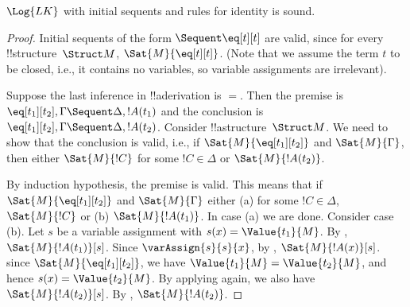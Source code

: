 \documentclass[../../../include/open-logic-section]{subfiles}
\begin{document}

\begin{prop}
$\Log{LK}$ with initial sequents and rules for identity is sound.
\end{prop}

\begin{proof}
Initial sequents of the form ${} \Sequent \eq[t][t]$ are valid, since
for every !!{structure}~$\Struct M$, $\Sat{M}{\eq[t][t]}$. (Note that
we assume the term $t$ to be closed, i.e., it contains no variables,
so variable assignments are irrelevant).

Suppose the last inference in !!a{derivation} is $=$. Then the premise
is $\eq[t_1][t_2], \Gamma \Sequent \Delta, !A(t_1)$ and the conclusion
is $\eq[t_1][t_2], \Gamma \Sequent \Delta, !A(t_2)$. Consider
!!a{structure}~$\Struct M$. We need to show that the conclusion is
valid, i.e., if $\Sat{M}{\eq[t_1][t_2]}$ and $\Sat{M}{\Gamma}$, then
either $\Sat{M}{!C}$ for some $!C \in \Delta$ or $\Sat{M}{!A(t_2)}$.

By induction hypothesis, the premise is valid. This means that if
$\Sat{M}{\eq[t_1][t_2]}$ and $\Sat{M}{\Gamma}$ either (a) for some $!C
\in \Delta$, $\Sat{M}{!C}$ or (b) $\Sat{M}{!A(t_1)}$. In case (a) we
are done. Consider case (b).  Let $s$ be a variable assignment with
$s(x) = \Value{t_1}{M}$.  By ,
$\Sat{M}{!A(t_1)}[s]$. Since $\varAssign{s}{s}{x}$, by
, $\Sat{M}{!A(x)}[s]$. since
$\Sat{M}{\eq[t_1][t_2]}$, we have $\Value{t_1}{M} = \Value{t_2}{M}$,
and hence $s(x) = \Value{t_2}{M}$.  By applying
 again, we also have
$\Sat{M}{!A(t_2)}[s]$.  By ,
$\Sat{M}{!A(t_2)}$.
\end{proof}
\end{document}
